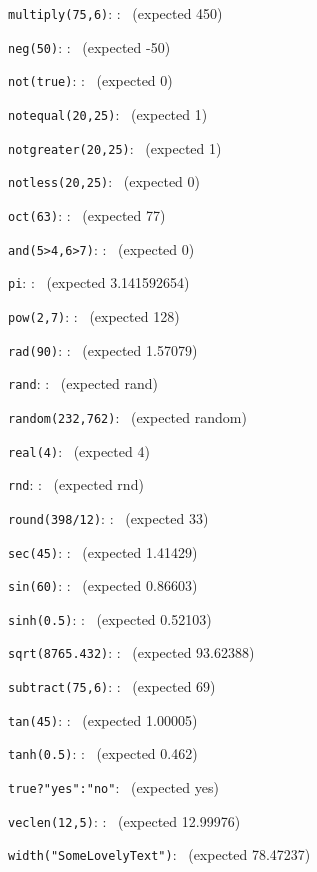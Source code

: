 \documentclass{article}
\begin{document}
\verb|multiply(75,6)|:
    :
   \pgfmathresult\ (expected  450)

\verb|neg(50)|:
    :
   \pgfmathresult\ (expected  -50)

\verb|not(true)|:
    :
   \pgfmathresult\ (expected  0)

\verb|notequal(20,25)|:
   \pgfmathresult\ (expected  1)

\verb|notgreater(20,25)|:
   \pgfmathresult\ (expected  1)

\verb|notless(20,25)|:
   \pgfmathresult\ (expected  0)

\verb|oct(63)|:
    :
   \pgfmathresult\ (expected  77)

\verb|and(5>4,6>7)|:
    :
   \pgfmathresult\ (expected  0)

\verb|pi|:
    :
   \pgfmathresult\ (expected  3.141592654)

\verb|pow(2,7)|:
    :
   \pgfmathresult\ (expected  128)

\verb|rad(90)|:
    :
   \pgfmathresult\ (expected  1.57079)

\verb|rand|:
    :
   \pgfmathresult\ (expected  rand)

\verb|random(232,762)|:
   \pgfmathresult\ (expected  random)

\verb|real(4)|:
   \pgfmathresult\ (expected  4)

\verb|rnd|:
    :
   \pgfmathresult\ (expected  rnd)

\verb|round(398/12)|:
    :
   \pgfmathresult\ (expected  33)

\verb|sec(45)|:
    :
   \pgfmathresult\ (expected  1.41429)

\verb|sin(60)|:
    :
   \pgfmathresult\ (expected  0.86603)

\verb|sinh(0.5)|:
    :
   \pgfmathresult\ (expected  0.52103)

\verb|sqrt(8765.432)|:
    :
   \pgfmathresult\ (expected  93.62388)

\verb|subtract(75,6)|:
    :
   \pgfmathresult\ (expected  69)

\verb|tan(45)|:
    :
   \pgfmathresult\ (expected  1.00005)

\verb|tanh(0.5)|:
    :
   \pgfmathresult\ (expected  0.462)

\verb|true?"yes":"no"|:
   \pgfmathresult\ (expected  yes)

\verb|veclen(12,5)|:
    :
   \pgfmathresult\ (expected  12.99976)

\verb|width("SomeLovelyText")|:
   \pgfmathresult\ (expected  78.47237)
\end{document}
